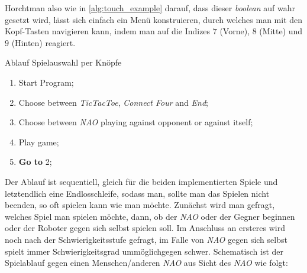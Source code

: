 \dq Horcht\dq man also wie in \ref{alg:touch_example} darauf, dass dieser \textit{boolean} auf wahr gesetzt wird, lässt sich einfach ein Menü konstruieren, durch welches man mit den Kopf-Tasten navigieren kann, indem man auf die Indizes $7$ (Vorne), $8$ (Mitte) und $9$ (Hinten) reagiert.\\

\begin{algorithm}[H]
    \LinesNumbered
    \SetAlgoLined
    \caption{Ablauf Spielauswahl per Knöpfe}\label{alg:main_menu}
    \begin{enumerate}
        \item Start Program;
        \item Choose between \textit{TicTacToe}, \textit{Connect Four} and \textit{End};
        \item Choose between \textit{NAO} playing against opponent or against itself;\\
        \item Play game;
        \item \textbf{Go to} 2;
    \end{enumerate}
    \end{algorithm}
\vspace{\baselineskip}
Der Ablauf ist sequentiell, gleich für die beiden implementierten Spiele und letztendlich eine Endlosschleife, sodass man, sollte man das Spielen nicht beenden, so oft spielen kann wie man möchte. Zunächst wird man gefragt, welches Spiel man spielen möchte, dann, ob der \textit{NAO} oder der Gegner beginnen oder der Roboter gegen sich selbst spielen soll. Im Anschluss an ersteres wird noch nach der Schwierigkeitsstufe gefragt, im Falle von \textit{NAO} gegen sich selbst spielt immer Schwierigkeitsgrad \dq ummöglich\dq gegen \dq schwer\dq . Schematisch ist der Spielablauf gegen einen Menschen/anderen \textit{NAO} aus Sicht des \textit{NAO} wie folgt:\\

